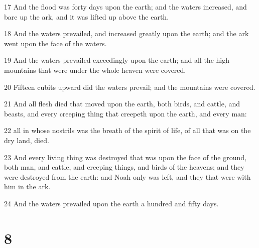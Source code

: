 \par 17 And the flood was forty days upon the earth; and the waters increased, and bare up the ark, and it was lifted up above the earth.
\par 18 And the waters prevailed, and increased greatly upon the earth; and the ark went upon the face of the waters.
\par 19 And the waters prevailed exceedingly upon the earth; and all the high mountains that were under the whole heaven were covered.
\par 20 Fifteen cubits upward did the waters prevail; and the mountains were covered.
\par 21 And all flesh died that moved upon the earth, both birds, and cattle, and beasts, and every creeping thing that creepeth upon the earth, and every man:
\par 22 all in whose nostrils was the breath of the spirit of life, of all that was on the dry land, died.
\par 23 And every living thing was destroyed that was upon the face of the ground, both man, and cattle, and creeping things, and birds of the heavens; and they were destroyed from the earth: and Noah only was left, and they that were with him in the ark.
\par 24 And the waters prevailed upon the earth a hundred and fifty days.

\chapter{8}

